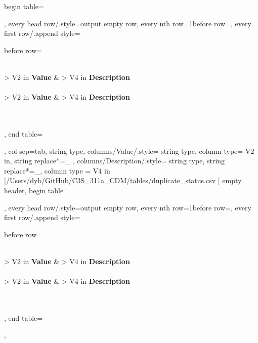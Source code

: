 \documentclass[a4paper]{article}
\begin{document}
    begin table=\begin{longtable},
    every head row/.style={output empty row},
    every nth row={1}{before row=\hline},
    every first row/.append style={
        before row={%
            \caption{Duplicate status}
            \label{tab:DataTable}\\
            \hline\hline {} { > {\centering}V{2 in}} { \textbf{Value}} &  { > {\centering} V{4 in} } {\textbf{Description}} \\ \hline\hline \endfirsthead
             \\
            \hline\hline {} { > {\centering}V{2 in} } { \textbf{Value}} &  { > {\centering} V{4 in} } {\textbf{Description}} \\ \hline\hline \endhead
             \\
            \endfoot
            \hline
             \\ 
            \endlastfoot
        }
    },
    end table=\end{longtable},
    col sep=tab,
    string type,
    columns/Value/.style={
            string type, 
            column type= V{2 in}, 
            string replace*={_}{}
        },
    columns/Description/.style={
            string type, 
            string replace*={_}{},
            column type = V{4 in}
        }
    ]{/Users/dyb/GitHub/C3S_311a_CDM/tables/duplicate_status.csv}
\pgfplotstabletypeset[
    empty header,
    begin table=\begin{longtable},
    every head row/.style={output empty row},
    every nth row={1}{before row=\hline},
    every first row/.append style={
        before row={%
            \caption{Events at station}
            \label{tab:DataTable}\\
            \hline\hline {} { > {\centering}V{2 in}} { \textbf{Value}} &  { > {\centering} V{4 in} } {\textbf{Description}} \\ \hline\hline \endfirsthead
             \\
            \hline\hline {} { > {\centering}V{2 in} } { \textbf{Value}} &  { > {\centering} V{4 in} } {\textbf{Description}} \\ \hline\hline \endhead
             \\
            \endfoot
            \hline
             \\ 
            \endlastfoot
        }
    },
    end table=\end{longtable},
\end{document}
